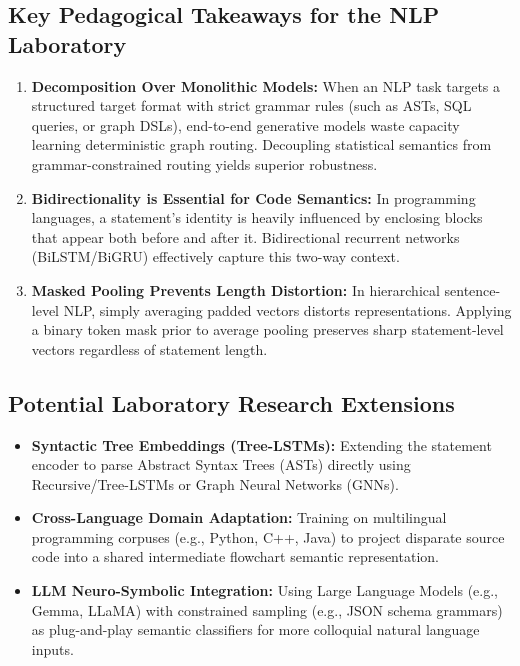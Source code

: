 \documentclass[11pt,a4paper]{article}
\begin{document}
\subsection{Key Pedagogical Takeaways for the NLP Laboratory}
\begin{enumerate}
    \item \textbf{Decomposition Over Monolithic Models:} When an NLP task targets a structured target format with strict grammar rules (such as ASTs, SQL queries, or graph DSLs), end-to-end generative models waste capacity learning deterministic graph routing. Decoupling statistical semantics from grammar-constrained routing yields superior robustness.
    \item \textbf{Bidirectionality is Essential for Code Semantics:} In programming languages, a statement's identity is heavily influenced by enclosing blocks that appear both before and after it. Bidirectional recurrent networks (BiLSTM/BiGRU) effectively capture this two-way context.
    \item \textbf{Masked Pooling Prevents Length Distortion:} In hierarchical sentence-level NLP, simply averaging padded vectors distorts representations. Applying a binary token mask prior to average pooling preserves sharp statement-level vectors regardless of statement length.
\end{enumerate}

\subsection{Potential Laboratory Research Extensions}
\begin{itemize}
    \item \textbf{Syntactic Tree Embeddings (Tree-LSTMs):} Extending the statement encoder to parse Abstract Syntax Trees (ASTs) directly using Recursive/Tree-LSTMs or Graph Neural Networks (GNNs).
    \item \textbf{Cross-Language Domain Adaptation:} Training on multilingual programming corpuses (e.g., Python, C++, Java) to project disparate source code into a shared intermediate flowchart semantic representation.
    \item \textbf{LLM Neuro-Symbolic Integration:} Using Large Language Models (e.g., Gemma, LLaMA) with constrained sampling (e.g., JSON schema grammars) as plug-and-play semantic classifiers for more colloquial natural language inputs.
\end{itemize}
\end{document}
